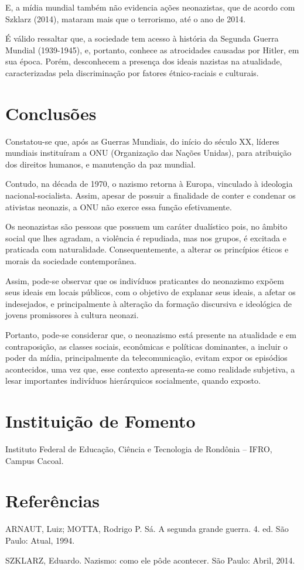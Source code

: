 \documentclass[article,12pt,onesidea,4paper,english,brazil]{abntex2}
\begin{document}
	E, a mídia mundial também não evidencia ações neonazistas, que de acordo com Szklarz (2014), mataram mais que o terrorismo, até o ano de 2014.
	
	É válido ressaltar que, a sociedade tem acesso à história da Segunda Guerra Mundial (1939-1945), e, portanto, conhece as atrocidades causadas por Hitler, em sua época. Porém, desconhecem a presença dos ideais nazistas na atualidade, caracterizadas pela discriminação por fatores étnico-raciais e culturais.
	
	\section*{Conclusões}
	
Constatou-se que, após as Guerras Mundiais, do início do século XX, líderes mundiais instituíram a ONU (Organização das Nações Unidas), para atribuição dos direitos humanos, e manutenção da paz mundial.

Contudo, na década de 1970, o nazismo retorna à Europa, vinculado à ideologia nacional-socialista. Assim, apesar de possuir a finalidade de conter e condenar os ativistas neonazis, a ONU não exerce essa função efetivamente.

Os neonazistas são pessoas que possuem um caráter dualístico pois, no âmbito social que lhes agradam, a violência é repudiada, mas nos grupos, é excitada e praticada com naturalidade. Consequentemente, a alterar os princípios éticos e morais da sociedade contemporânea.

Assim, pode-se observar que os indivíduos praticantes do neonazismo expõem seus ideais em locais públicos, com o objetivo de explanar seus ideais, a afetar os indesejados, e principalmente à alteração da formação discursiva e ideológica de jovens promissores à cultura neonazi.

Portanto, pode-se considerar que, o neonazismo está presente na atualidade e em contraposição, as classes sociais, econômicas e políticas dominantes, a incluir o poder da mídia, principalmente da telecomunicação, evitam expor os episódios acontecidos, uma vez que, esse contexto apresenta-se como realidade subjetiva, a lesar importantes indivíduos hierárquicos socialmente, quando exposto.
	
	\section*{Instituição de Fomento}
	
	Instituto Federal de Educação, Ciência e Tecnologia de Rondônia – IFRO, Campus Cacoal.
	
	\sloppy
	\section*{Referências}
	
\noindent ARNAUT, Luiz; MOTTA, Rodrigo P. Sá. A segunda grande guerra. 4. ed. São Paulo: Atual, 1994.

\noindent SZKLARZ, Eduardo. Nazismo: como ele pôde acontecer. São Paulo: Abril, 2014.
	
\end{document}
